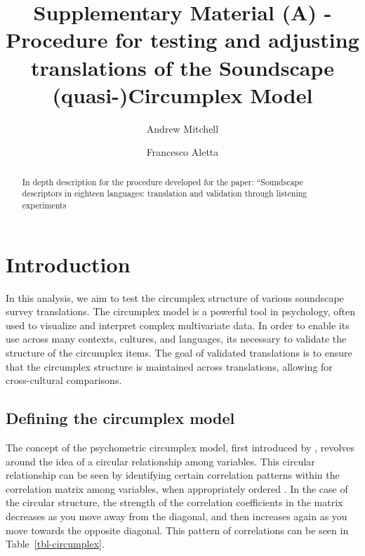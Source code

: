 \documentclass[
  authoryear,
  preprint,
  3p]{elsarticle}
\begin{document}
\begin{frontmatter}
\title{Supplementary Material (A) - Procedure for testing and adjusting
translations of the Soundscape (quasi-)Circumplex Model}
\author[1]{Andrew Mitchell%
%
}
\author[1]{Francesco Aletta%
%
}




        
\begin{abstract}
In depth description for the procedure developed for the paper:
``Soundscape descriptors in eighteen languages: translation and
validation through listening experiments
\end{abstract}





\end{frontmatter}
    \section{Introduction}\label{introduction}

In this analysis, we aim to test the circumplex structure of various
soundscape survey translations. The circumplex model is a powerful tool
in psychology, often used to visualize and interpret complex
multivariate data. In order to enable its use across many contexts,
cultures, and languages, its necessary to validate the structure of the
circumplex items. The goal of validated translations is to ensure that
the circumplex structure is maintained across translations, allowing for
cross-cultural comparisons.

\subsection{Defining the circumplex
model}\label{defining-the-circumplex-model}

The concept of the psychometric circumplex model, first introduced by
\citet{Guttman1954new}, revolves around the idea of a circular
relationship among variables. This circular relationship can be seen by
identifying certain correlation patterns within the correlation matrix
among variables, when appropriately ordered
\citep{Browne1992Circumplex}. In the case of the circular structure, the
strength of the correlation coefficients in the matrix decreases as you
move away from the diagonal, and then increases again as you move
towards the opposite diagonal. This pattern of correlations can be seen
in Table~\ref{tbl-circumplex}.
\end{document}
